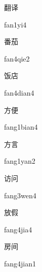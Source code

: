 \begin{multicols*}{2}
\begin{verbete}[fan1yi4]{翻译}
\begin{pronuncia}{fan1yi4}
\end{pronuncia}
\end{verbete}

\begin{verbete}{番茄}
\begin{pronuncia}{fan4qie2}
\end{pronuncia}
\end{verbete}

\begin{verbete}{饭店}
\begin{pronuncia}{fan4dian4}
\end{pronuncia}
\end{verbete}

\begin{verbete}{方便}
\begin{pronuncia}{fang1bian4}
\end{pronuncia}
\end{verbete}

\begin{verbete}{方言}
\begin{pronuncia}{fang1yan2}
\end{pronuncia}
\end{verbete}

\begin{verbete}{访问}
\begin{pronuncia}{fang3wen4}
\end{pronuncia}
\end{verbete}

\begin{verbete}{放假}
\begin{pronuncia}{fang4jia4}
\end{pronuncia}
\end{verbete}

\begin{verbete}{房间}
\begin{pronuncia}{fang4jian1}
\end{pronuncia}
\end{verbete}


\end{multicols*}
